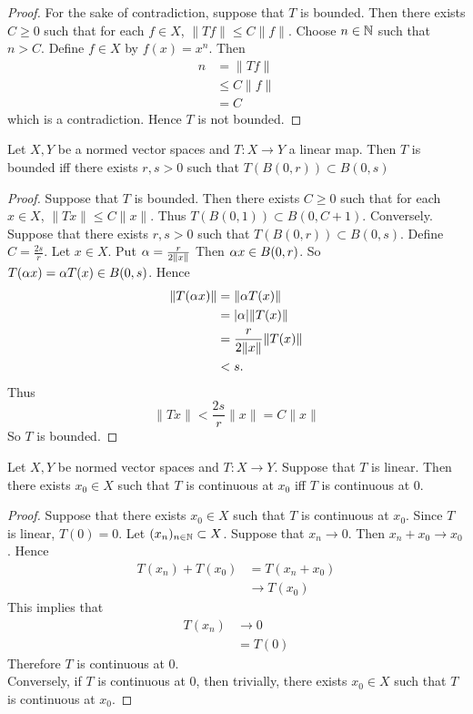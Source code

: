 \documentclass{book}
\begin{document}
	\begin{proof}
	For the sake of contradiction, suppose that $T$ is bounded. Then there exists $C \geq 0$ such that for each $f \in X$, $\|Tf\| \leq C \|f\|$. Choose $n \in \mathbb{N}$ such that $n > C$. Define $f \in X$ by $f(x) = x^n$. Then
	\begin{align*}
	n
	&= \|Tf\| \\
	&\leq C \|f\| \\
	&= C
\end{align*}		
	which is a contradiction. Hence $T$ is not bounded.
	\end{proof}
	
	\begin{ex} 
		Let $X,Y$ be a normed vector spaces and $T:X \rightarrow Y$ a linear map. Then $T$ is bounded iff there exists $r,s>0$ such that $T(B(0,r)) \subset B(0,s)$
	\end{ex}
	
	\begin{proof}
		Suppose that $T$ is bounded. Then there exists $C \geq 0$ such that for each $x \in X$, $\|Tx \|\leq C \|x \|$. Thus $T(B(0,1)) \subset B(0,C+1)$. Conversely. Suppose that there exists $r,s >0$ such that $T(B(0,r)) \subset B(0,s)$. Define $C = \frac{2s}{r}$. Let $x \in X$. Put $\alpha = \frac{r}{2\|x \|}$ Then $\alpha x \in B(0,r)$. So $T(\alpha x ) = \alpha T(x) \in B(0,s)$. Hence 
		\begin{align*}
			\|T(\alpha x) \|
			&= \|\alpha T(x) \|\\
			&= \vert \alpha \vert \|T(x) \|\\
			& = \frac{r}{2 \|x \|}  \|T(x) \|\\
			& < s.
		\end{align*}
		Thus $$\|Tx \|< \frac{2 s}{r} \|x \|= C \|x \|$$ So $T$ is bounded. 
	\end{proof}
	
	\begin{ex} 
	Let $X, Y$ be normed vector spaces and $T:X \rightarrow Y$. Suppose that $T$ is linear. Then there exists $x_0 \in X$ such that $T$ is continuous at $x_0$ iff $T$ is continuous at 0.
	\end{ex}
	
	\begin{proof}
	Suppose that there exists $x_0 \in X$ such that $T$ is continuous at $x_0$. Since $T$ is linear, $T(0) = 0$. Let $(x_n)_{n \in \mathbb{N}} \subset X$. Suppose that $x_n \rightarrow 0$. Then $x_n + x_0 \rightarrow x_0$. Hence 
	\begin{align*}
	T(x_n) + T(x_0)
	&= T(x_n + x_0) \\
	& \rightarrow T(x_0)
	\end{align*}	  
	This implies that 
	\begin{align*}
	T(x_n) 
	&\rightarrow 0 \\
	& = T(0)
	\end{align*}	 
	Therefore $T$ is continuous at $0$. \\
	Conversely, if $T$ is continuous at $0$, then trivially, there exists $x_0 \in X$ such that $T$ is continuous at $x_0$.
	\end{proof}
	
\end{document}
